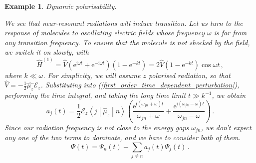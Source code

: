 \documentclass{article}
\theoremstyle{plain}\theoremheaderfont{\normalfont\itshape}\theorembodyfont{\rmfamily}\theoremseparator{.}\newtheorem*{rem}{Remark}\newtheorem*{ex}{Example}\newtheorem*{proof}{Proof}\newtheorem*{altp}{Alternative proof}
\theoremstyle{plain}\theoremheaderfont{\normalfont\bfseries}\theorembodyfont{\rmfamily}\theoremseparator{.}\newtheorem{thm}{Theorem}[section]\newtheorem{lem}[thm]{Lemma}\newtheorem{prop}[thm]{Proposition}\newtheorem*{cor}{Corollary}\newtheorem{defn}[thm]{Definition}\newtheorem{clm}[thm]{Claim}\newtheorem{clminproof}{Claim}
\theoremstyle{break}\theoremheaderfont{\normalfont\itshape}\theorembodyfont{\rmfamily}\theoremseparator{.\medskip}\newtheorem*{proofskip}{Proof}\newtheorem*{exs}{Examples}\newtheorem*{rems}{Remarks}
\theoremstyle{break}\theoremheaderfont{\normalfont\bfseries}\theorembodyfont{\rmfamily}\theoremseparator{.\medskip}\newtheorem{lemskip}[thm]{Lemma}\newtheorem{defnskip}[thm]{Definition}\newtheorem{propskip}[thm]{Proposition}\newtheorem{thmskip}[thm]{Theorem}
\numberwithin{equation}{section}
\newcommand{\ii}{\mathrm{i}}
\newcommand{\ee}{\mathrm{e}}
\newcommand{\mel}[3]{\left\langle #1 \middle| #2 \middle| #3 \right\rangle}
\begin{document}
    \begin{ex}
        \textit{Dynamic polarisability.}

        We see that near-resonant radiations will induce transition. Let us turn to the response of molecules to oscillating electric fields whose frequency \(\omega\) is far from any transition frequency. To ensure that the molecule is not shocked by the field, we switch it on slowly, with
        \begin{equation}
            \hat{H}^{(1)}=\hat{V}(\ee^{\ii\omega t}+\ee^{-\ii\omega t})(1-\ee^{-kt})=2\hat{V}(1-\ee^{-kt})\cos\omega t\,,
        \end{equation}
        where \(k\ll \omega\). For simplicity, we will assume \(z\) polarised radiation, so that \(\hat{V}=-\frac{1}{2}\hat{\mu_z}\mathcal{E}_z\). Substituting into (\ref{first_order_time_dependent_perturbation}), performing the time integral, and taking the long time limit \(t\gg k^{-1}\), we obtain
        \begin{equation}
            a_j(t)=\frac{1}{2}\mathcal{E}_z\mel{j}{\hat{\mu}_z}{n}\left(\frac{\ee^{\ii(\omega_{jn}+\omega)t}}{\omega_{jn}+\omega}+\frac{\ee^{\ii(\omega_{jn}-\omega)t}}{\omega_{jn}-\omega}\right)\,.
        \end{equation}
        Since our radiation frequency is not close to the energy gaps \(\omega_{jn}\), we don't expect any one of the two terms to dominate, and we have to consider both of them.
        \begin{equation}
            \Psi(t)=\Psi_n(t)+\sum_{j\ne n}a_j(t)\Psi_j(t)\,.
        \end{equation}


\end{ex}
\end{document}
